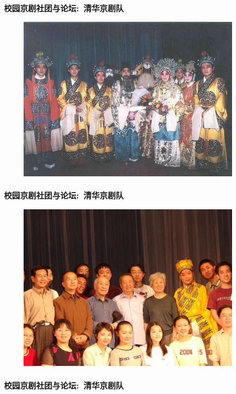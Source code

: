 \documentclass[cjk,slidestop,compress,mathserif,blue]{beamer}
\begin{document}
\frame
{
	\frametitle{校园京剧社团与论坛:~清华京剧队}
\begin{figure}[h!]
\centering
\vspace{-0.3in}
\includegraphics[height=0.70\textwidth,width=1.00\textwidth,clip]{Figures/PekOpe_THU-2.jpg}
\label{THU-2}
\end{figure}
}

\frame
{
	\frametitle{校园京剧社团与论坛:~清华京剧队}
\begin{figure}[h!]
\centering
\vspace{-0.2in}
\includegraphics[height=0.70\textwidth,width=1.00\textwidth,clip]{Figures/PekOpe_THU-3.jpg}
\label{THU-3}
\end{figure}
}

\frame
{
	\frametitle{校园京剧社团与论坛:~清华京剧队}
\centering
\vspace{-0.15in}
\fontsize{4.2pt}{3.2pt}\selectfont{
}
}
\end{document}
